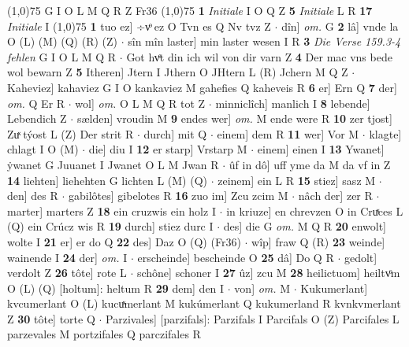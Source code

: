 \documentclass[8pt,a4paper,notitlepage]{article}
\begin{document}
\begin{table}[ht]
\begin{minipage}[t]{0.5\linewidth}
\begin{tabular}{rl}
\end{tabular}
\scriptsize
\line(1,0){75} \newline
G I O L M Q R Z Fr36 \newline
\line(1,0){75} \newline
\textbf{1} \textit{Initiale} I O Q Z  \textbf{5} \textit{Initiale} L R  \textbf{17} \textit{Initiale} I  \newline
\line(1,0){75} \newline
\textbf{1} tuo ez] ÷vͦ ez O Tvn es Q Nv tvz Z  $\cdot$ dîn] \textit{om.} G \textbf{2} lâ] vnde la O (L) (M) (Q) (R) (Z)  $\cdot$ sîn mîn laster] min laster wesen I R \textbf{3} \textit{Die Verse 159.3-4 fehlen} G I O L M Q R   $\cdot$ Got hvͤt din ich wil von dir varn Z \textbf{4} Der mac vns bede wol bewarn Z \textbf{5} Itheren] Jtern I Jthern O JHtern L (R) Jchern M Q Z  $\cdot$ Kaheviez] kahaviez G I O kankaviez M gahefies Q kaheveis R \textbf{6} er] Ern Q \textbf{7} der] \textit{om.} Q Er R  $\cdot$ wol] \textit{om.} O L M Q R tot Z  $\cdot$ minniclîch] manlich I \textbf{8} lebende] Lebendich Z  $\cdot$ sælden] vroudin M \textbf{9} endes wer] \textit{om.} M ende were R \textbf{10} zer tjost] Zuͯ týost L (Z) Der strit R  $\cdot$ durch] mit Q  $\cdot$ einem] dem R \textbf{11} wer] Vor M  $\cdot$ klagte] chlagt I O (M)  $\cdot$ die] diu I \textbf{12} er starp] Vrstarp M  $\cdot$ einem] einen I \textbf{13} Ywanet] ẏwanet G Juuanet I Jwanet O L M Jwan R  $\cdot$ ûf in dô] uff yme da M da vf in Z \textbf{14} liehten] liehehten G lichten L (M) (Q)  $\cdot$ zeinem] ein L R \textbf{15} stiez] sasz M  $\cdot$ den] des R  $\cdot$ gabilôtes] gibelotes R \textbf{16} zuo im] Zcu zcim M  $\cdot$ nâch der] zer R  $\cdot$ marter] marters Z \textbf{18} ein cruzwis ein holz I  $\cdot$ in kriuze] en chrevzen O in Cruͯces L (Q) ein Crúcz wis R \textbf{19} durch] stiez durc I  $\cdot$ des] die G \textit{om.} M Q R \textbf{20} enwolt] wolte I \textbf{21} er] er do Q \textbf{22} des] Daz O (Q) (Fr36)  $\cdot$ wîp] fraw Q (R) \textbf{23} weinde] wainende I \textbf{24} der] \textit{om.} I  $\cdot$ erscheinde] bescheinde O \textbf{25} dâ] Do Q R  $\cdot$ gedolt] verdolt Z \textbf{26} tôte] rote L  $\cdot$ schône] schoner I \textbf{27} ûz] zcu M \textbf{28} heilictuom] heiltvͦm O (L) (Q) [holtum]: heltum  R \textbf{29} dem] den I  $\cdot$ von] \textit{om.} M  $\cdot$ Kukumerlant] kvcumerlant O (L) kucuͯmerlant M kukúmerlant Q kukumerland R kvnkvmerlant Z \textbf{30} tôte] torte Q  $\cdot$ Parzivales] [parzifals]: Parzifals I Parcifals O (Z) Parcifales L parzevales M portzifales Q parczifales R \newline

\end{minipage}
\end{table}
\end{document}
